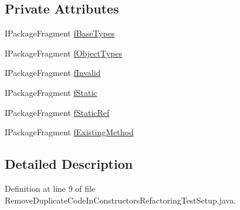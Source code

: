 \subsection*{Private Attributes}
\begin{DoxyCompactItemize}
\item 
IPackageFragment \hyperlink{classedu_1_1illinois_1_1canistelCassabanana_1_1tests_1_1RemoveDuplicateCodeInConstructorsRefactoringTestSetup_a6c6ee1308a16ef2cbdd1a66605a4fbfa}{fBaseTypes}
\item 
IPackageFragment \hyperlink{classedu_1_1illinois_1_1canistelCassabanana_1_1tests_1_1RemoveDuplicateCodeInConstructorsRefactoringTestSetup_abe1fbe53e3d90f623a37cc5c933145dc}{fObjectTypes}
\item 
IPackageFragment \hyperlink{classedu_1_1illinois_1_1canistelCassabanana_1_1tests_1_1RemoveDuplicateCodeInConstructorsRefactoringTestSetup_a421cc733d2ba660b2cbc1ffb94b6ba5c}{fInvalid}
\item 
IPackageFragment \hyperlink{classedu_1_1illinois_1_1canistelCassabanana_1_1tests_1_1RemoveDuplicateCodeInConstructorsRefactoringTestSetup_a46435fa8daac96d40f1be8e638df6d4e}{fStatic}
\item 
IPackageFragment \hyperlink{classedu_1_1illinois_1_1canistelCassabanana_1_1tests_1_1RemoveDuplicateCodeInConstructorsRefactoringTestSetup_ac1eec28ae69c00995fd82d6182c27ab9}{fStaticRef}
\item 
IPackageFragment \hyperlink{classedu_1_1illinois_1_1canistelCassabanana_1_1tests_1_1RemoveDuplicateCodeInConstructorsRefactoringTestSetup_a220aede9c7539af9e2ebef07cbf6ab53}{fExistingMethod}
\end{DoxyCompactItemize}


\subsection{Detailed Description}


Definition at line 9 of file RemoveDuplicateCodeInConstructorsRefactoringTestSetup.java.



